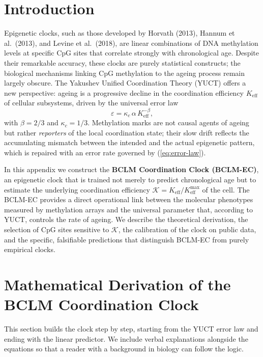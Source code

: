 \documentclass[12pt,a4paper]{article}
\newcommand{\REL}{\mathcal{K}}          %
\begin{document}
	\tableofcontents
	\newpage
	
	\section{Introduction}
	\label{sec:intro}
	Epigenetic clocks, such as those developed by Horvath (2013), Hannum et al.\ (2013), and Levine et al.\ (2018), are linear combinations of DNA methylation levels at specific CpG sites that correlate strongly with chronological age.
	Despite their remarkable accuracy, these clocks are purely statistical constructs; the biological mechanisms linking CpG methylation to the ageing process remain largely obscure.
	The Yakushev Unified Coordination Theory (YUCT) offers a new perspective: ageing is a progressive decline in the coordination efficiency \(K_{\mathrm{eff}}\) of cellular subsystems, driven by the universal error law
	\begin{equation}
		\varepsilon = \kappa_c \, \alpha \, K_{\mathrm{eff}}^{-\beta},
		\label{eq:error-law}
	\end{equation}
	with \(\beta = 2/3\) and \(\kappa_c = 1/3\).
	Methylation marks are not causal agents of ageing but rather \emph{reporters} of the local coordination state; their slow drift reflects the accumulating mismatch between the intended and the actual epigenetic pattern, which is repaired with an error rate governed by (\ref{eq:error-law}).
	
	In this appendix we construct the \textbf{BCLM Coordination Clock (BCLM-EC)}, an epigenetic clock that is trained not merely to predict chronological age but to estimate the underlying coordination efficiency \(\REL = K_{\mathrm{eff}}/K_{\mathrm{eff}}^{\max}\) of the cell.
	The BCLM-EC provides a direct operational link between the molecular phenotypes measured by methylation arrays and the universal parameter that, according to YUCT, controls the rate of ageing.
	We describe the theoretical derivation, the selection of CpG sites sensitive to \(\REL\), the calibration of the clock on public data, and the specific, falsifiable predictions that distinguish BCLM-EC from purely empirical clocks.
	
	\section{Mathematical Derivation of the BCLM Coordination Clock}
	\label{sec:math}
	This section builds the clock step by step, starting from the YUCT error law and ending with the linear predictor. We include verbal explanations alongside the equations so that a reader with a background in biology can follow the logic.
	
\end{document}
